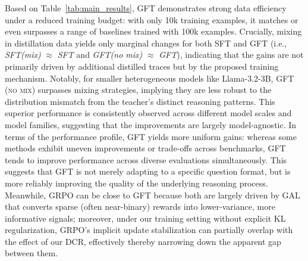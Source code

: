 Based on Table~\ref{tab:main_results}, GFT demonstrates strong data efficiency under a reduced training budget: with only 10k training examples, it matches or even surpasses a range of baselines trained with 100k examples. Crucially, mixing in distillation data yields only marginal changes for both SFT and GFT (i.e., \textit{SFT(mix)} $\approx$ \textit{SFT} and \textit{GFT(no mix)} $\approx$ \textit{GFT}), indicating that the gains are not primarily driven by additional distilled traces but by the proposed training mechanism. Notably, for smaller heterogeneous models like Llama-3.2-3B, \textsc{GFT (no mix)} surpasses mixing strategies, implying they are less robust to the distribution mismatch from the teacher's distinct reasoning patterns. This superior performance is consistently observed across different model scales and model families, suggesting that the improvements are largely model-agnostic. In terms of the performance profile, GFT yields more uniform gains: whereas some methods exhibit uneven improvements or trade-offs across benchmarks, GFT tends to improve performance across diverse evaluations simultaneously. This suggests that GFT is not merely adapting to a specific question format, but is more reliably improving the quality of the underlying reasoning process. Meanwhile, GRPO can be close to GFT because both are largely driven by GAL that converts sparse (often near-binary) rewards into lower-variance, more informative signals; moreover, under our training setting without explicit KL regularization, GRPO's implicit update stabilization can partially overlap with the effect of our DCR, effectively thereby narrowing down the apparent gap between them.

